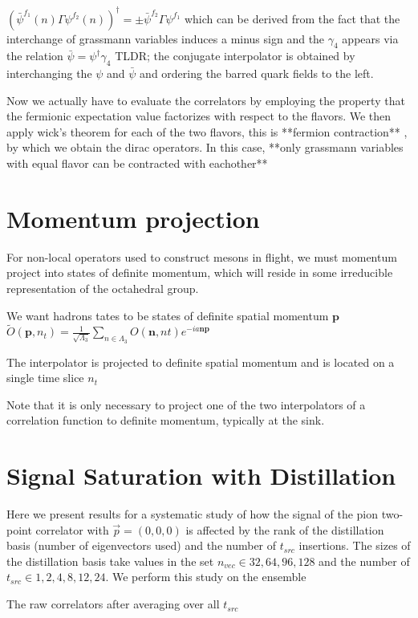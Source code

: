 $(\bar{\psi}^{f_1}(n)\Gamma\psi^{f_2}(n))^{\dagger} = \pm \bar{\psi}^{f_2} \Gamma \psi^{f_1}$
which can be derived from the fact that the interchange of grassmann variables induces a minus sign and the $\gamma_4$ appears via the relation $\bar{\psi} = \psi^{\dagger}\gamma_4$
TLDR; the conjugate interpolator is obtained by interchanging the $\psi$ and $\bar{\psi}$ and ordering the barred quark fields to the left. 

Now we actually have to evaluate the correlators by employing the property that the fermionic expectation value factorizes with respect to the flavors. We then apply wick's theorem for each of the two flavors, this is **fermion contraction** , by which we obtain the dirac operators. In this case, **only grassmann variables with equal flavor can be contracted with eachother** 

\section{Momentum projection}
For non-local operators used to construct mesons in flight, we must momentum project into states of definite momentum, which will reside in some irreducible representation of the octahedral group. 

We want hadrons tates to be states of definite spatial momentum $\textbf{p}$ 
$\tilde{O}(\textbf{p},n_t) = \frac{1}{\sqrt{\Lambda_3}} \sum_{n\in\Lambda_3} O(\textbf{n},nt)e^{-ia\textbf{np}}$ 

The interpolator is projected to definite spatial momentum and is located on a single time slice $n_t$

Note that it is only necessary to project one of the two interpolators of a correlation function to definite momentum, typically at the sink. 

\section{Signal Saturation with Distillation}

Here we present results for a systematic study of how the signal of the pion two-point correlator with $\vec{p}=(0,0,0)$ is affected by the rank of the distillation basis (number of eigenvectors used) and the number of $t_{src}$ insertions. The sizes of the distillation basis take values in the set $n_{vec}\in {32,64,96,128}$ and the number of $t_{src} \in {1,2,4,8,12,24}$. We perform this study on the ensemble 

The raw correlators after averaging over all $t_{src}$ 

